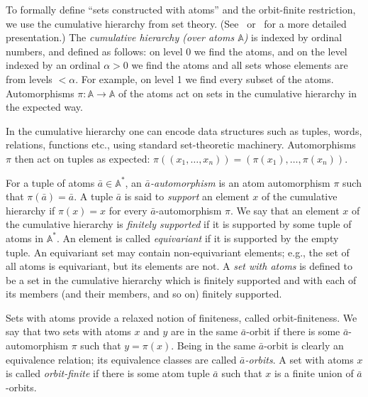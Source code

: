 \documentclass{theoretics}
\newcommand{\atoms}{\mathbb A}
\begin{document}
 To formally define ``sets constructed with atoms'' and the orbit-finite restriction, we use the cumulative hierarchy from set theory. (See~\cite[Sec.~3.1]{bojanczyk_slightly2018} or~\cite[Sec.~2.6]{pitts} for a more detailed presentation.)
The \emph{cumulative hierarchy (over atoms $\atoms$)}  is indexed by ordinal numbers, and defined as follows: on level 0 we find the atoms, and on the level indexed by an ordinal $\alpha>0$ we find the atoms and all sets whose elements are from levels $< \alpha$. For example, on level 1 we find every subset of the atoms.  Automorphisms $\pi : \atoms \to \atoms$ of the atoms act on sets in the cumulative hierarchy in the expected way. 

In the cumulative hierarchy one can encode data structures such as tuples, words, relations, functions etc., using standard set-theoretic machinery.
Automorphisms $\pi$ then act on tuples as expected: $\pi((x_1, \ldots, x_n)) = (\pi(x_1), \ldots, \pi(x_n))$.

For a tuple of atoms $\bar a \in \atoms^*$, an {\em $\bar a$-automorphism} is an atom automorphism $\pi$ such that $\pi(\bar a)=\bar a$. A tuple $\bar a$ is said to \emph{support} an element $x$ of the cumulative hierarchy if
$\pi(x) = x$ for every $\bar a$-automorphism $\pi$.
    We say that an element $x$ of the cumulative hierarchy is \emph{finitely supported} if it is supported by some tuple of atoms in $\atoms^*$. An element is called {\em equivariant} if it is supported by the empty tuple. An equivariant set may contain non-equivariant elements; e.g., the set of all atoms is equivariant, but its elements are not. 
    A \emph{set with atoms} is defined to be a set in the cumulative hierarchy which is finitely supported and with each of its members (and their members, and so on) finitely supported.

Sets with atoms provide a relaxed notion of finiteness, called orbit-finiteness.
We say that two sets with atoms $x$ and $y$ are in the same $\bar a$-orbit if there is some $\bar a$-automorphism $\pi$ such that $y = \pi(x)$. 
Being in the same $\bar a$-orbit is clearly an equivalence relation; its equivalence classes are called {\em $\bar a$-orbits}. A set with atoms $x$ is called \emph{orbit-finite} if there is some atom tuple $\bar a$ such that $x$ is a finite union of $\bar a$-orbits.
\end{document}
